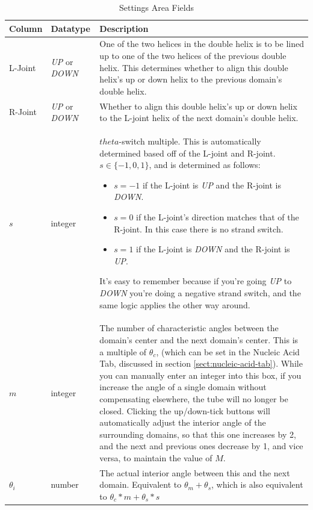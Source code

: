 \documentclass[titlepage]{article}
\begin{document}
\begin{longtable}{|p{.9in}|p{1in}|p{3in}|}
	\caption{Settings Area Fields} \\

	Column & Datatype & Description \\
	\hline
	
	L-Joint & \textit{UP} or \textit{DOWN} & One of the two helices in the double helix is to be lined up to one of the two helices of the previous double helix. This determines whether to align this double helix's up or down helix to the previous domain's double helix. \\
	\hline
	
	R-Joint & \textit{UP} or \textit{DOWN} & Whether to align this double helix's up or down helix to the L-joint helix of the next domain's double helix. \\
	\hline
	
	$s$ & integer & $theta$-switch multiple. This is automatically determined based off of the L-joint and R-joint. $s \in \{-1, 0, 1\}$, and is determined as follows:
	\begin{itemize}
		\item $s=-1$ if the L-joint is \textit{UP} and the R-joint is \textit{DOWN}.
		\item $s=0$ if the L-joint's direction matches that of the R-joint. In this case there is no strand switch.
		\item $s=1$ if the L-joint is \textit{DOWN} and the R-joint is \textit{UP}.
	\end{itemize}
	It's easy to remember because if you're going \textit{UP} to \textit{DOWN} you're doing a negative strand switch, and the same logic applies the other way around.	\\
	\hline
	
	$m$ & integer & The number of characteristic angles between the domain's center and the next domain's center. This is a multiple of $\theta_c$, (which can be set in the Nucleic Acid Tab, discussed in section \ref{sect:nucleic-acid-tab}). While you can manually enter an integer into this box, if you increase the angle of a single domain without compensating elsewhere, the tube will no longer be closed. Clicking the up/down-tick buttons will automatically adjust the interior angle of the surrounding domains, so that this one increases by 2, and the next and previous ones decrease by 1, and vice versa, to maintain the value of $M$. \\
	\hline
	
	$\theta_i$ & number & The actual interior angle between this and the next domain. Equivalent to $\theta_m + \theta_s$, which is also equivalent to $\theta_c*m + \theta_s*s$ \\
\end{longtable}
\end{document}
